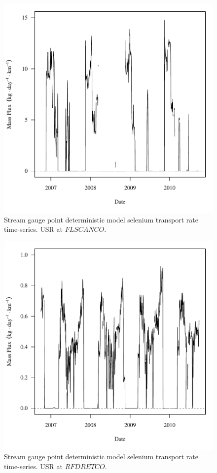 \begin{figure}[htbp]
	\begin{center}
	\includegraphics[width=6in]{"Figures/Results_DUSR/f FLS"}
	\caption{Stream gauge point deterministic model selenium transport rate time-series.  USR at $FLSCANCO$.}
	\end{center}
\end{figure}
\newpage

\begin{figure}[htbp]
	\begin{center}
	\includegraphics[width=6in]{"Figures/Results_DUSR/f RFR"}
	\caption{Stream gauge point deterministic model selenium transport rate time-series.  USR at $RFDRETCO$.}
	\end{center}
\end{figure}
\newpage

